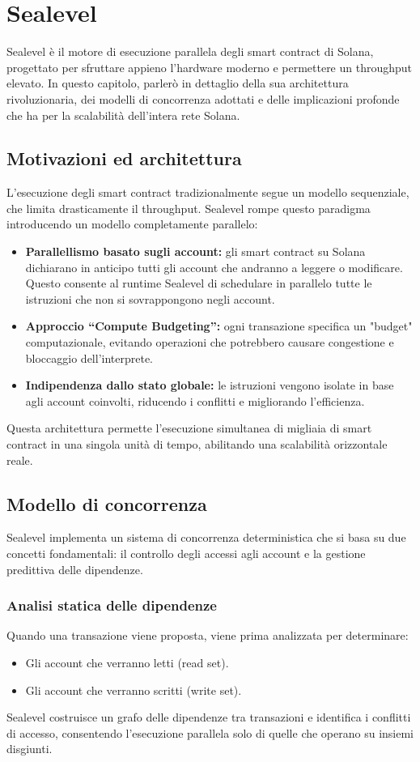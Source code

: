 \documentclass[a4paper,12pt]{report}
\begin{document}
	\section{Sealevel}
	Sealevel è il motore di esecuzione parallela degli smart contract di Solana, progettato per sfruttare appieno l’hardware moderno e permettere un throughput elevato. In questo capitolo, parlerò in dettaglio della sua architettura rivoluzionaria, dei modelli di concorrenza adottati e delle implicazioni profonde che ha per la scalabilità dell'intera rete Solana.
	
	\subsection{Motivazioni ed architettura}
	L’esecuzione degli smart contract tradizionalmente segue un modello sequenziale, che limita drasticamente il throughput. Sealevel rompe questo paradigma introducendo un modello completamente parallelo:
	\begin{itemize}
		\item \textbf{Parallellismo basato sugli account:} gli smart contract su Solana dichiarano in anticipo tutti gli account che andranno a leggere o modificare. Questo consente al runtime Sealevel di schedulare in parallelo tutte le istruzioni che non si sovrappongono negli account.
		\item \textbf{Approccio “Compute Budgeting”:} ogni transazione specifica un "budget" computazionale, evitando operazioni che potrebbero causare congestione e bloccaggio dell’interprete.
		\item \textbf{Indipendenza dallo stato globale:} le istruzioni vengono isolate in base agli account coinvolti, riducendo i conflitti e migliorando l'efficienza.
	\end{itemize}
	Questa architettura permette l’esecuzione simultanea di migliaia di smart contract in una singola unità di tempo, abilitando una scalabilità orizzontale reale.
	
	\subsection{Modello di concorrenza}
	Sealevel implementa un sistema di concorrenza deterministica che si basa su due concetti fondamentali: il controllo degli accessi agli account e la gestione predittiva delle dipendenze.
	
	\subsubsection{Analisi statica delle dipendenze}
	Quando una transazione viene proposta, viene prima analizzata per determinare:
	\begin{itemize}
		\item Gli account che verranno letti (read set).
		\item Gli account che verranno scritti (write set).
	\end{itemize}
	Sealevel costruisce un grafo delle dipendenze tra transazioni e identifica i conflitti di accesso, consentendo l’esecuzione parallela solo di quelle che operano su insiemi disgiunti.
	
\end{document}
